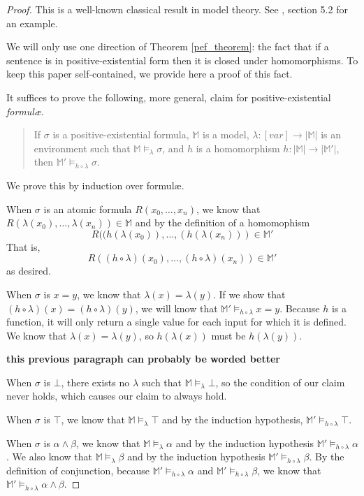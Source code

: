 		\begin{proof}
			This is a well-known classical result in model theory. See
			\cite{ChangKeisler73}, section 5.2 for an example.

			We will only use one direction of Theorem \ref{pef_theorem}: the
			fact that if a sentence is in positive-existential form then it is
			closed under homomorphisms. To keep this paper self-contained, we
			provide here a proof of this fact.

			It suffices to prove the following, more general, claim for
			positive-existential \emph{formul{\ae}}.

			\begin{quote}
				If $\sigma$ is a positive-existential formula, $\mathbb{M}$ is
				a model, $\lambda : [var] \to |\mathbb{M}|$ is an environment
				such that $\mathbb{M} \models_\lambda \sigma$, and $h$ is a
				homomorphism $h : |\mathbb{M}| \to |\mathbb{M}'|$, then
				$\mathbb{M}' \models_{h\circ\lambda} \sigma$.
			\end{quote}

			We prove this by induction over formul{\ae}.

			When $\sigma$ is an atomic formula $R(x_0,\ldots,x_n)$, we know
			that $R(\lambda(x_0),\ldots,\lambda(x_n)) \in \mathbb{M}$ and by
			the definition of a homomophism
				\[
				R((h(\lambda(x_0)),\ldots,(h(\lambda(x_n))) \in \mathbb{M}'
				\]
			That is,
				\[
				R((h\circ\lambda)(x_0),\ldots,(h\circ\lambda)(x_n)) \in \mathbb{M'}
				\]
			as desired.

			When $\sigma$ is $x=y$, we know that $\lambda(x) = \lambda(y)$. If
			we show that $(h\circ\lambda)(x) = (h\circ\lambda)(y)$, we will
			know that $\mathbb{M}' \models_{h\circ\lambda} x=y$. Because $h$
			is a function, it will only return a single value for each input
			for which it is defined. We know that $\lambda(x) = \lambda(y)$, so
			$h(\lambda(x))$ must be $h(\lambda(y))$.

			\textbf{this previous paragraph can probably be worded better}

			When $\sigma$ is $\bot$, there exists no $\lambda$ such that
			$\mathbb{M} \models_\lambda \bot$, so the condition of our claim
			never holds, which causes our claim to always hold.

			When $\sigma$ is $\top$, we know that $\mathbb{M} \models_\lambda
			\top$ and by the induction hypothesis, $\mathbb{M}'
			\models_{h\circ\lambda} \top$.

			When $\sigma$ is $\alpha \wedge \beta$, we know that $\mathbb{M}
			\models_\lambda \alpha$ and by the induction hypothesis
			$\mathbb{M}' \models_{h\circ\lambda} \alpha$. We also know that
			$\mathbb{M} \models_\lambda \beta$ and by the induction hypothesis
			$\mathbb{M}' \models_{h\circ\lambda} \beta$. By the definition of
			conjunction, because $\mathbb{M}' \models_{h\circ\lambda} \alpha$
			and $\mathbb{M}' \models_{h\circ\lambda} \beta$, we know that
			$\mathbb{M}' \models_{h\circ\lambda} \alpha \wedge \beta$.


\end{proof}
